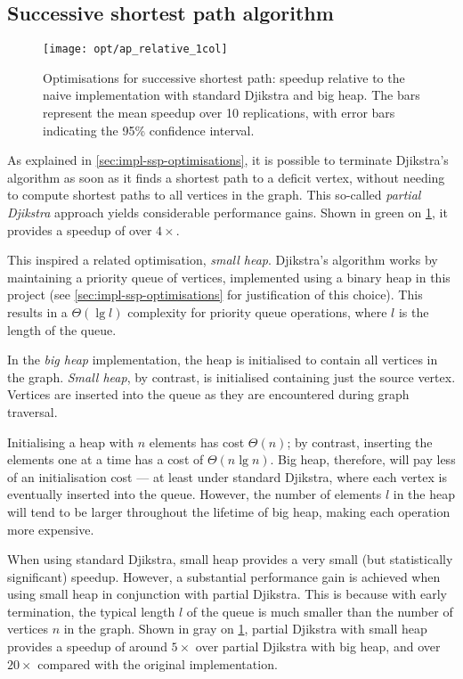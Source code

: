 \subsection{Successive shortest path algorithm}

\begin{figure}
    \centering
    \texttt{[image: opt/ap\_relative\_1col]}
    \caption[Optimisations for successive shortest path]{Optimisations for successive shortest path: speedup relative to the naive implementation with standard Djikstra and big heap. The bars represent the mean speedup over 10 replications, with error bars indicating the 95\% confidence interval.}
    \label{fig:opt-ap}
\end{figure}

As explained in \cref{sec:impl-ssp-optimisations}, it is possible to terminate Djikstra's algorithm as soon as it finds a shortest path to a deficit vertex, without needing to compute shortest paths to all vertices in the graph. This so-called \emph{partial Djikstra} approach yields considerable performance gains. Shown in green on \cref{fig:opt-ap}, it provides a speedup of over $4\times$.

This inspired a related optimisation, \emph{small heap}. Djikstra's algorithm works by maintaining a priority queue of vertices, implemented using a binary heap in this project (see \cref{sec:impl-ssp-optimisations} for justification of this choice). This results in a $\Theta\left(\lg l\right)$ complexity for priority queue operations, where $l$ is the length of the queue.

In the \emph{big heap} implementation, the heap is initialised to contain all vertices in the graph. \emph{Small heap}, by contrast, is initialised containing just the source vertex. Vertices are inserted into the queue as they are encountered during graph traversal.

Initialising a heap with $n$ elements has cost $\Theta(n)$; by contrast, inserting the elements one at a time has a cost of $\Theta(n\lg n)$. Big heap, therefore, will pay less of an initialisation cost --- at least under standard Djikstra, where each vertex is eventually inserted into the queue. However, the number of elements $l$ in the heap will tend to be larger throughout the lifetime of big heap, making each operation more expensive.

When using standard Djikstra, small heap provides a very small (but statistically significant) speedup. However, a substantial performance gain is achieved when using small heap in conjunction with partial Djikstra. This is because with early termination, the typical length $l$ of the queue is much smaller than the number of vertices $n$ in the graph. Shown in gray on \cref{fig:opt-ap}, partial Djikstra with small heap provides a speedup of around $5\times$ over partial Djikstra with big heap, and over $20\times$ compared with the original implementation.


